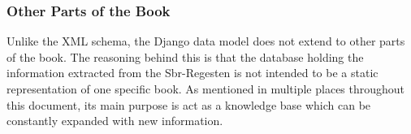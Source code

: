 \subsubsection{Other Parts of the Book}
\label{sec:other-model}

Unlike the XML schema, the Django data model does not extend to other
parts of the book. The reasoning behind this is that the database
holding the information extracted from the Sbr-Regesten is not
intended to be a static representation of one specific book. As
mentioned in multiple places throughout this document, its main
purpose is act as a knowledge base which can be constantly expanded
with new information.
